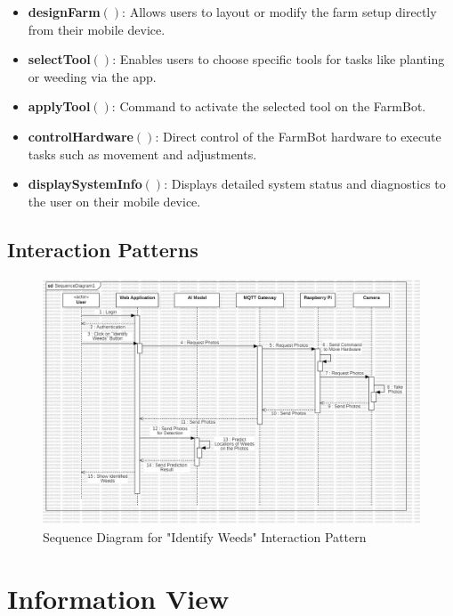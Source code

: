 \begin{itemize}
\begin{itemize}
            \item \textbf{designFarm}$()$: Allows users to layout or modify the farm setup directly from their mobile device.
            \item \textbf{selectTool}$()$: Enables users to choose specific tools for tasks like planting or weeding via the app.
            \item \textbf{applyTool}$()$: Command to activate the selected tool on the FarmBot.
            \item \textbf{controlHardware}$()$: Direct control of the FarmBot hardware to execute tasks such as movement and adjustments.
            \item \textbf{displaySystemInfo}$()$: Displays detailed system status and diagnostics to the user on their mobile device.
        \end{itemize}
\end{itemize}

\newpage
\subsection{Interaction Patterns}
\begin{figure}[htbp]
    \centering
    \includegraphics[width=1\linewidth]{Figures/sequence4.jpg}
    \caption{Sequence Diagram for "Identify Weeds" Interaction Pattern}
    \label{Sequence4}
\end{figure}
\newpage

\section{Information View}

